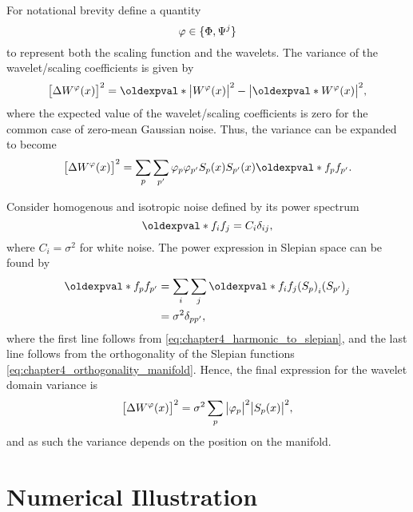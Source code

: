 For notational brevity define a quantity
%
\begin{equation}
	\varphi \in \{\Phi,\Psi^{j}\}
\end{equation}
%
to represent both the scaling function and the wavelets.
The variance of the wavelet/scaling coefficients is given by
%
\begin{equation}
	\variance{\mesh{W^{\varphi}}}
	= \expval{\abs{\mesh{W^{\varphi}}}^{2}}
	-\abs{\expval{\mesh{W^{\varphi}}}}^{2},
\end{equation}
%
where the expected value of the wavelet/scaling coefficients is zero for the common case of zero-mean Gaussian noise.
Thus, the variance can be expanded to become
%
\begin{equation}\label{eq:chapter4_slepian_isotropic_noise}
	\variance{\mesh{W^{\varphi}}}
	= \slepianSum \slepianSum['] \slepian{\varphi} \slepian[']{\varphi} \mesh{\slepian{S}} \mesh{\slepian[']{S}} \expval{\slepian{f} \slepian[']{f}}.
\end{equation}

Consider homogenous and isotropic noise defined by its power spectrum
%
\begin{equation}
	\expval{f_{i} f_{j}}
	= C_{i} \delta_{i j},
\end{equation}
%
where \(C_{i} = \sigma^{2}\) for white noise.
The power expression in Slepian space can be found by
%
\begin{align}
	\expval{\slepian{f} \slepian[']{f}}
	 & = \sum\limits_{i} \sum\limits_{j} \expval{f_{i} f_{j}} \empty{} {(\slepian{S})}_{i} {(\slepian[']{S})}_{j} \nonumber \\
	 & = \sigma^{2} \delta_{pp'},
\end{align}
%
where the first line follows from \cref{eq:chapter4_harmonic_to_slepian}, and the last line follows from the orthogonality of the Slepian functions \cref{eq:chapter4_orthogonality_manifold}.
Hence, the final expression for the wavelet domain variance is
%
\begin{equation}
	{\big[\Delta W^{\varphi}(x)\big]}^{2}
	= \sigma^{2} \sum\limits_{p} \big\lvert{\varphi}_{p}\big\rvert^{2} \big\lvert{S}_{p}(x)\big\rvert^{2},
\end{equation}
%
and as such the variance depends on the position on the manifold.

\section{Numerical Illustration}\label{sec:chapter4_numerical_illustration}

